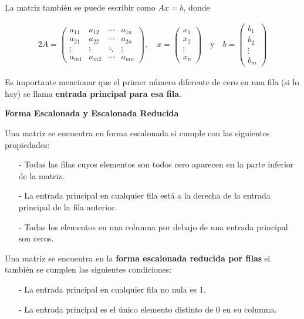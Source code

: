 \documentclass{article}
\begin{document}
\pagebreak

La matriz también se puede escribir como $Ax = b$, donde 

\begin{alignat*}{2}
    A = \begin{pmatrix}
        a_{11} & a_{12} & \dotsb & a_{1n}\\
        a_{21} & a_{22} & \dotsb & a_{2n}\\
        \vdots & \vdots & \ddots & \vdots\\
        a_{m1} & a_{m2} & \dotsb & a_{mn}
    \end{pmatrix}, 
    \quad x= \begin{pmatrix}
        x_1\\
        x_2\\
        \vdots\\
        x_n
    \end{pmatrix} 
    \quad \text{y} \quad b = 
    \begin{pmatrix}
        b_1\\
        b_2\\
        \vdots\\
        b_m
    \end{pmatrix} 
\end{alignat*}

Es importante mencionar que el primer número diferente de cero en una fila (si lo hay) se llama \textbf{entrada principal para esa fila}. 

\begin{large}
    \textbf{Forma Escalonada y Escalonada Reducida}
\end{large}

Una matriz se encuentra en forma escalonada si cumple con las siguientes propiedades:

\begin{tcolorbox}[colback=blue!10!white,colframe=blue!60!black,title=Propiedades de la Forma Escalonada]
    \begin{itemize}
        \item[-] Todas las filas cuyos elementos son todos cero aparecen en la parte inferior de la matriz.
        \item[-] La entrada principal en cualquier fila está a la derecha de la entrada principal de la fila anterior.
        \item[-] Todas los elementos en una columna por debajo de una entrada principal son ceros.
    \end{itemize}   
    Una matriz se encuentra en la \textbf{forma escalonada reducida por filas} si también se cumplen las siguientes condiciones:
    \begin{itemize}
        \item[-] La entrada principal en cualquier fila no nula es 1.
        \item[-] La entrada principal es el único elemento distinto de 0 en su columna.
    \end{itemize}    
\end{tcolorbox}
\end{document}
